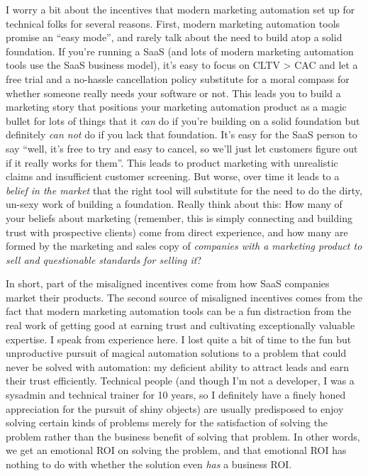 I worry a bit about the incentives that modern marketing automation set up for technical folks for several reasons. First, modern marketing automation tools promise an ``easy mode'', and rarely talk about the need to build atop a solid foundation. If you're running a SaaS (and lots of modern marketing automation tools use the SaaS business model), it's easy to focus on CLTV \textgreater{} CAC and let a free trial and a no-hassle cancellation policy substitute for a moral compass for whether someone really needs your software or not. This leads you to build a marketing story that positions your marketing automation product as a magic bullet for lots of things that it \emph{can} do if you're building on a solid foundation but definitely \emph{can not} do if you lack that foundation. It's easy for the SaaS person to say ``well, it's free to try and easy to cancel, so we'll just let customers figure out if it really works for them''. This leads to product marketing with unrealistic claims and insufficient customer screening. But worse, over time it leads to a \emph{belief in the market} that the right tool will substitute for the need to do the dirty, un-sexy work of building a foundation. Really think about this: How many of your beliefs about marketing (remember, this is simply connecting and building trust with prospective clients) come from direct experience, and how many are formed by the marketing and sales copy of \emph{companies with a marketing product to sell and questionable standards for selling it}?

In short, part of the misaligned incentives come from how SaaS companies market their products. The second source of misaligned incentives comes from the fact that modern marketing automation tools can be a fun distraction from the real work of getting good at earning trust and cultivating exceptionally valuable expertise. I speak from experience here. I lost quite a bit of time to the fun but unproductive pursuit of magical automation solutions to a problem that could never be solved with automation: my deficient ability to attract leads and earn their trust efficiently. Technical people (and though I'm not a developer, I was a sysadmin and technical trainer for 10 years, so I definitely have a finely honed appreciation for the pursuit of shiny objects) are usually predisposed to enjoy solving certain kinds of problems merely for the satisfaction of solving the problem rather than the business benefit of solving that problem. In other words, we get an emotional ROI on solving the problem, and that emotional ROI has nothing to do with whether the solution even \emph{has} a business ROI.

